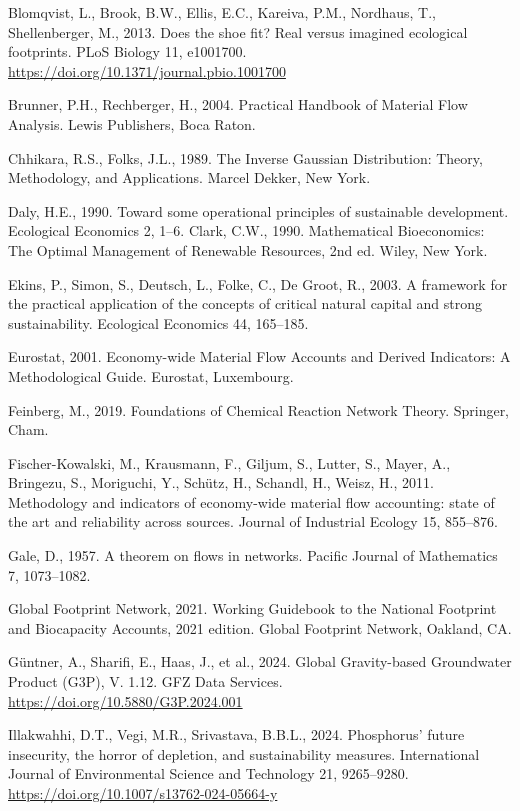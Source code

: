 \documentclass[11pt]{article}
\begin{document}
Blomqvist, L., Brook, B.W., Ellis, E.C., Kareiva, P.M., Nordhaus, T., Shellenberger, M., 2013. Does the shoe fit? Real versus imagined ecological footprints. PLoS Biology 11, e1001700. \url{https://doi.org/10.1371/journal.pbio.1001700}

Brunner, P.H., Rechberger, H., 2004. Practical Handbook of Material Flow Analysis. Lewis Publishers, Boca Raton.

Chhikara, R.S., Folks, J.L., 1989. The Inverse Gaussian Distribution: Theory, Methodology, and Applications. Marcel Dekker, New York.

Daly, H.E., 1990. Toward some operational principles of sustainable development. Ecological Economics 2, 1--6. Clark, C.W., 1990. Mathematical Bioeconomics: The Optimal Management of Renewable Resources, 2nd ed. Wiley, New York.

Ekins, P., Simon, S., Deutsch, L., Folke, C., De Groot, R., 2003. A framework for the practical application of the concepts of critical natural capital and strong sustainability. Ecological Economics 44, 165--185.

Eurostat, 2001. Economy-wide Material Flow Accounts and Derived Indicators: A Methodological Guide. Eurostat, Luxembourg.

Feinberg, M., 2019. Foundations of Chemical Reaction Network Theory. Springer, Cham.

Fischer-Kowalski, M., Krausmann, F., Giljum, S., Lutter, S., Mayer, A., Bringezu, S., Moriguchi, Y., Sch\"{u}tz, H., Schandl, H., Weisz, H., 2011. Methodology and indicators of economy-wide material flow accounting: state of the art and reliability across sources. Journal of Industrial Ecology 15, 855--876.

Gale, D., 1957. A theorem on flows in networks. Pacific Journal of Mathematics 7, 1073--1082.

Global Footprint Network, 2021. Working Guidebook to the National Footprint and Biocapacity Accounts, 2021 edition. Global Footprint Network, Oakland, CA.

G\"{u}ntner, A., Sharifi, E., Haas, J., et al., 2024. Global Gravity-based Groundwater Product (G3P), V. 1.12. GFZ Data Services. \url{https://doi.org/10.5880/G3P.2024.001}

Illakwahhi, D.T., Vegi, M.R., Srivastava, B.B.L., 2024. Phosphorus' future insecurity, the horror of depletion, and sustainability measures. International Journal of Environmental Science and Technology 21, 9265--9280. \url{https://doi.org/10.1007/s13762-024-05664-y}
\end{document}
